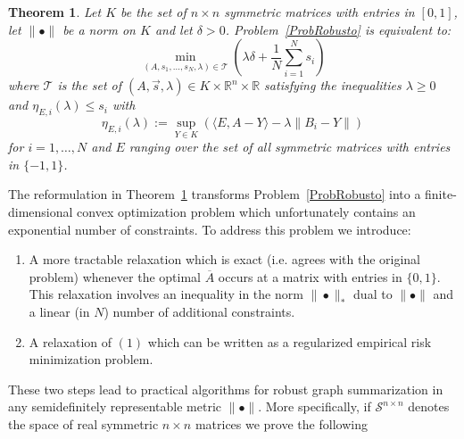 \documentclass[12pt]{amsart}
\newtheorem{theorem}[lemma]{Theorem}
\theoremstyle{remark}
\newcommand{\RR}{\mathbb{R}}
\begin{document}
\begin{theorem}\label{thm: finiteConvex} Let $K$ be the set of $n\times n$ symmetric matrices with entries in $[0,1]$, let $\|\bullet\|$ be a norm on $K$ and let $\delta>0$. Problem~\ref{ProbRobusto} is equivalent to:
\[\min_{(A,s_1,\dots, s_N,\lambda)\in \mathcal{T}}\left( \lambda\delta +\frac{1}{N}\sum_{i=1}^N s_i \right)\]
where $\mathcal{T}$ is the set of $(A,\vec{s},\lambda)\in K\times \RR^n\times \RR$  satisfying the inequalities $\lambda\geq 0$ and $\eta_{E, i}(\lambda)\leq s_i$ with
\[\eta_{E, i}(\lambda):= \sup_{Y\in K} \left(\langle E, A-Y\rangle -\lambda \|B_i-Y\|\right)\]
for $i=1,\dots, N$ and $E$ ranging over the set of all symmetric matrices with entries in $\{-1,1\}$.
\end{theorem}

The reformulation in Theorem~\ref{thm: finiteConvex} transforms Problem~\ref{ProbRobusto} into a finite-dimensional convex optimization problem which unfortunately contains  an exponential number of constraints. To address this problem we introduce:
\begin{enumerate}
\item A more tractable relaxation which is exact (i.e. agrees with the original problem) whenever the optimal $\overline{A}$ occurs at a matrix with entries in $\{0,1\}$. This relaxation involves an inequality in the norm $\|\bullet\|_{*}$ dual to $\|\bullet\|$ and a linear (in $N$) number of additional constraints.
\item A relaxation of $(1)$ which can be written as a regularized empirical risk minimization problem.
\end{enumerate}
These two steps lead to practical algorithms for robust graph summarization in any semidefinitely representable metric $\|\bullet\|$. More specifically, if $\mathcal{S}^{n\times n}$ denotes the space of real symmetric $n\times n$ matrices we prove the following 
\end{document}
